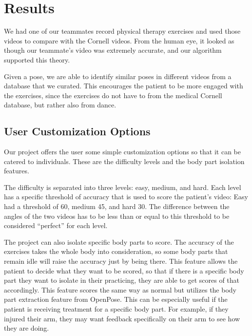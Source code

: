 \section{Results}
\label{sec:results}

\indent We had one of our teammates record physical therapy exercises and used those videos to compare with 
the Cornell videos. From the human eye, it looked as though our teammate's video was extremely accurate, and 
our algorithm supported this theory.  

\indent Given a pose, we are able to identify similar poses in different videos from a database that we 
curated. This encourages the patient to be more engaged with the exercises, since the exercises do not have to 
 from the medical Cornell database, but rather also from dance.

\subsection{User Customization Options}
\indent Our project offers the user some simple customization options so that it can be catered to individuals. 
These are the difficulty levels and the body part isolation features.

\indent The difficulty is separated into three levels: easy, medium, and hard. Each level has a specific threshold 
of accuracy that is used to score the patient's video: Easy had a threshold of 60, medium 45, and hard 30. The 
difference between the angles of the two videos has to be less than or equal to this threshold to be considered “perfect” for each level. 

\indent The project can also isolate specific body parts to score. The accuracy of the exercises takes the whole body into consideration, 
so some body parts that remain idle will raise the accuracy just by being there. This feature allows the patient to decide 
what they want to be scored, so that if there is a specific body part they want to isolate in their practicing, they are 
able to get scores of that accordingly. This feature scores the same way as normal but utilizes the body part extraction feature 
from OpenPose. This can be especially useful if the patient is receiving treatment for a specific body part. For example, if 
they injured their arm, they may want feedback specifically on their arm to see how they are doing.
